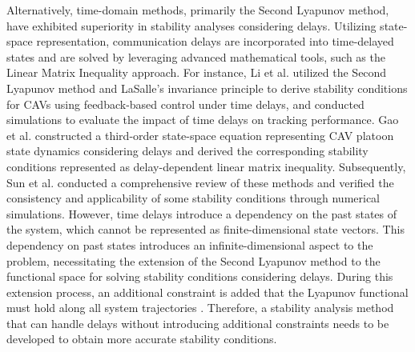 \documentclass[a4paper]{cas-sc}
\begin{document}
Alternatively, time-domain methods, primarily the Second Lyapunov method, have exhibited superiority in stability analyses considering delays. Utilizing state-space representation, communication delays are incorporated into time-delayed states and are solved by leveraging advanced mathematical tools, such as the Linear Matrix Inequality approach. For instance, Li et al. \citep{7554764, 8623721} utilized the Second Lyapunov method and LaSalle's invariance principle to derive stability conditions for CAVs using feedback-based control under time delays, and conducted simulations to evaluate the impact of time delays on tracking performance. Gao et al. \citep{gao2016robust} constructed a third-order state-space equation representing CAV platoon state dynamics considering delays and derived the corresponding stability conditions represented as delay-dependent linear matrix inequality. Subsequently, Sun et al. \citep{sun_stability_2018} conducted a comprehensive review of these methods and verified the consistency and applicability of some stability conditions through numerical simulations. However, time delays introduce a dependency on the past states of the system, which cannot be represented as finite-dimensional state vectors. This dependency on past states introduces an infinite-dimensional aspect to the problem, necessitating the extension of the Second Lyapunov method to the functional space for solving stability conditions considering delays. During this extension process, an additional constraint is added that the Lyapunov functional must hold along all system trajectories \citep{fridman2006descriptor,fridman2014tutorial, wang2016fuzzy, lian2020dissipativity}. Therefore, a stability analysis method that can handle delays without introducing additional constraints needs to be developed to obtain more accurate stability conditions.

\end{document}
